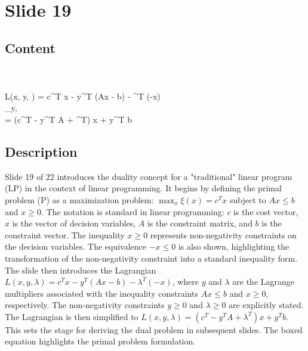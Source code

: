 \documentclass{article}%
\begin{document}
%
\newpage%
\section{Slide 19}%
\label{sec:Slide19}%
\subsection{Content}%

 \\
 \\
L(x, y, \lambda) = c^T x - y^T (Ax - b) - \lambda^T (-x) \\
_{y, \lambda {}} \\
= (c^T - y^T A + \lambda^T) x + y^T b
%
\subsection{Description}%
Slide 19 of 22 introduces the duality concept for a "traditional" linear program (LP) in the context of linear programming.  It begins by defining the primal problem (P) as a maximization problem: $\max_x \xi(x) = c^T x$ subject to $Ax \le b$ and $x \ge 0$. The notation is standard in linear programming: $c$ is the cost vector, $x$ is the vector of decision variables, $A$ is the constraint matrix, and $b$ is the constraint vector. The inequality $x \ge 0$ represents non-negativity constraints on the decision variables.  The equivalence $-x \le 0$ is also shown, highlighting the transformation of the non-negativity constraint into a standard inequality form. The slide then introduces the Lagrangian $L(x, y, \lambda) = c^T x - y^T(Ax - b) - \lambda^T(-x)$, where $y$ and $\lambda$ are the Lagrange multipliers associated with the inequality constraints $Ax \le b$ and $x \ge 0$, respectively. The non-negativity constraints $y \ge 0$ and $\lambda \ge 0$ are explicitly stated. The Lagrangian is then simplified to $L(x, y, \lambda) = (c^T - y^T A + \lambda^T)x + y^T b$. This sets the stage for deriving the dual problem in subsequent slides. The boxed equation highlights the primal problem formulation.%
\end{document}
